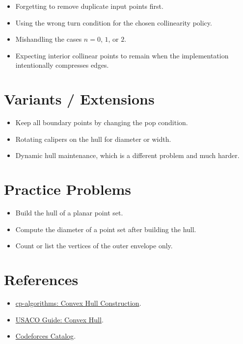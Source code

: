 \begin{itemize}
  \item Forgetting to remove duplicate input points first.
  \item Using the wrong turn condition for the chosen collinearity policy.
  \item Mishandling the cases \(n = 0\), \(1\), or \(2\).
  \item Expecting interior collinear points to remain when the implementation intentionally compresses edges.
\end{itemize}

\section*{Variants / Extensions}

\begin{itemize}
  \item Keep all boundary points by changing the pop condition.
  \item Rotating calipers on the hull for diameter or width.
  \item Dynamic hull maintenance, which is a different problem and much harder.
\end{itemize}

\section*{Practice Problems}

\begin{itemize}
  \item Build the hull of a planar point set.
  \item Compute the diameter of a point set after building the hull.
  \item Count or list the vertices of the outer envelope only.
\end{itemize}

\section*{References}

\begin{itemize}
  \item \href{https://cp-algorithms.com/geometry/convex-hull.html}{cp-algorithms: Convex Hull Construction}.
  \item \href{https://usaco.guide/plat/convex-hull}{USACO Guide: Convex Hull}.
  \item \href{https://codeforces.com/catalog}{Codeforces Catalog}.
\end{itemize}
